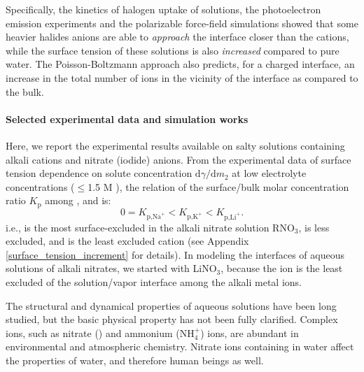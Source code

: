 Specifically, the kinetics of halogen uptake of solutions\cite{HuJH95}, the photoelectron emission experiments\cite{Markovich1991,Ghosal05,Garrett04} and the polarizable 
force-field simulations\cite{Perera1991,Dang1993,Knipping00,Jungwirth2001,Jungwirth2002,PJ06,Horinek07,Brown08,CST11} showed that 
some heavier halides anions are able to \emph{approach} the interface closer than the cations, 
while the surface tension of these solutions is also \emph{increased} compared to pure water. 
The Poisson-Boltzmann approach also predicts, for a charged interface, an increase in the total number of ions in the vicinity of the interface as compared to the bulk\cite{Manciu2003}.

\paragraph{Selected experimental data and simulation works}
Here, we report the experimental results available on salty solutions containing alkali cations and nitrate (iodide) anions\cite{PS03,AJ12,HuaWei2014}. 
From the experimental data of surface tension dependence on solute concentration $\text{d}\gamma/\text{d}m_2$ 
at low electrolyte concentrations ($\leq$1.5 M )\cite{Weissenborn95,Hey81,Jarvis68,Jarvis72}, 
the relation of the surface/bulk molar concentration ratio $K_{\text{p}}$\cite{Pegram2006} among \li, \Na and \K is: 
\begin{equation}
0=K_{\text{p,Na}^+}< K_{\text{p,K}^+}< K_{\text{p,Li}^+}.\nonumber
\label{eq:bscr}
\end{equation}
i.e., \Na is the most surface-excluded in the alkali nitrate solution RNO$_3$, \K is less excluded, 
and \Li is the least excluded cation (see Appendix \ref{surface_tension_increment} for details).
In modeling the interfaces of aqueous solutions of alkali nitrates, we started with LiNO$_3$, 
because the \Li ion is the least excluded of the solution/vapor interface among the alkali metal ions. 

The structural and dynamical properties of aqueous solutions have been long studied, but the basic physical
property has not been fully clarified.
Complex ions, such as nitrate (\nitrate) and ammonium (NH$_4^+$) ions,
are abundant in environmental and  atmospheric chemistry.\cite{SG05,Yadav2017} 
Nitrate ions containing in water affect the properties of water, and therefore human beings as well.\cite{Comly45,Knobeloch00} 

